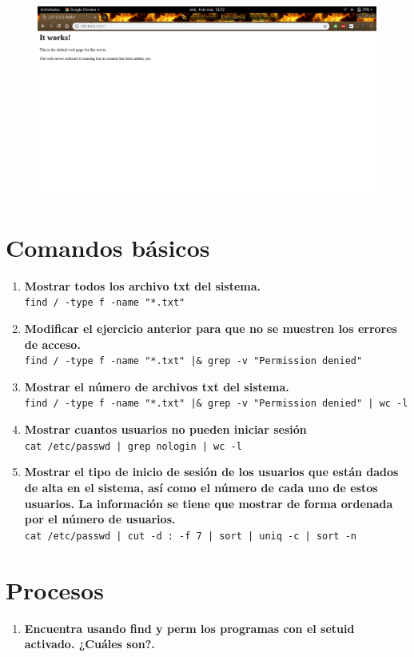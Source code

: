\documentclass[12pt,letterpaper]{article}
\begin{document}
\begin{figure}[h]
	\centering
	\includegraphics[scale=0.34]{apache.png}
\end{figure}

\section{Comandos básicos}
\begin{enumerate}
	\item \textbf{Mostrar todos los archivo txt del sistema.} \\ \texttt{find / -type f -name "*.txt"}
	\item \textbf{Modificar el ejercicio anterior para que no se muestren los errores de acceso.} \\ \texttt{find / -type f -name "*.txt" |\& grep -v "Permission denied"}
	\item \textbf{Mostrar el número de archivos txt del sistema.} \\ \texttt{find / -type f -name "*.txt" |\& grep -v "Permission denied" | wc -l}
	\item \textbf{Mostrar cuantos usuarios no pueden iniciar sesión} \\ \texttt{cat /etc/passwd | grep nologin | wc -l}
	\item \textbf{Mostrar el tipo de inicio de sesión de los usuarios que están dados de alta en el sistema, así como el número de cada uno de estos usuarios. La información se tiene que mostrar de forma ordenada por el número de usuarios.} \\ \texttt{cat /etc/passwd | cut -d : -f 7 | sort | uniq -c | sort -n}
\end{enumerate}

\section{Procesos}
\begin{enumerate}
	\item \textbf{Encuentra usando find y perm los programas con el setuid activado. ¿Cuáles son?.}
	
\end{enumerate}
\end{document}
